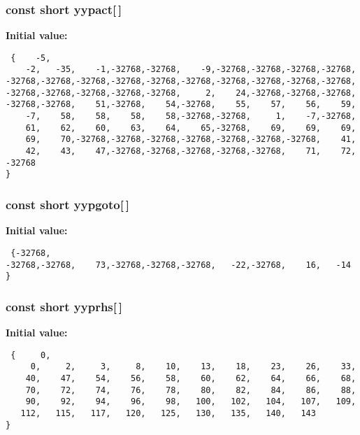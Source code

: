 \subsubsection{\setlength{\rightskip}{0pt plus 5cm}const short yypact[$\,$]\hspace{0.3cm}{\tt  [static]}}\label{vcd__parser_8c_a92}


{\bf Initial value:}

\footnotesize\begin{verbatim} {    -5,
    -2,   -35,    -1,-32768,-32768,    -9,-32768,-32768,-32768,-32768,
-32768,-32768,-32768,-32768,-32768,-32768,-32768,-32768,-32768,-32768,
-32768,-32768,-32768,-32768,-32768,     2,    24,-32768,-32768,-32768,
-32768,-32768,    51,-32768,    54,-32768,    55,    57,    56,    59,
    -7,    58,    58,    58,    58,-32768,-32768,     1,    -7,-32768,
    61,    62,    60,    63,    64,    65,-32768,    69,    69,    69,
    69,    70,-32768,-32768,-32768,-32768,-32768,-32768,-32768,    41,
    42,    43,    47,-32768,-32768,-32768,-32768,-32768,    71,    72,
-32768
}\end{verbatim}\normalsize 
{}
\subsubsection{\setlength{\rightskip}{0pt plus 5cm}const short yypgoto[$\,$]\hspace{0.3cm}{\tt  [static]}}\label{vcd__parser_8c_a93}


{\bf Initial value:}

\footnotesize\begin{verbatim} {-32768,
-32768,-32768,    73,-32768,-32768,-32768,   -22,-32768,    16,   -14
}\end{verbatim}\normalsize 
{}
\subsubsection{\setlength{\rightskip}{0pt plus 5cm}const short yyprhs[$\,$]\hspace{0.3cm}{\tt  [static]}}\label{vcd__parser_8c_a84}


{\bf Initial value:}

\footnotesize\begin{verbatim} {     0,
     0,     2,     3,     8,    10,    13,    18,    23,    26,    33,
    40,    47,    54,    56,    58,    60,    62,    64,    66,    68,
    70,    72,    74,    76,    78,    80,    82,    84,    86,    88,
    90,    92,    94,    96,    98,   100,   102,   104,   107,   109,
   112,   115,   117,   120,   125,   130,   135,   140,   143
}\end{verbatim}\normalsize 
{}
